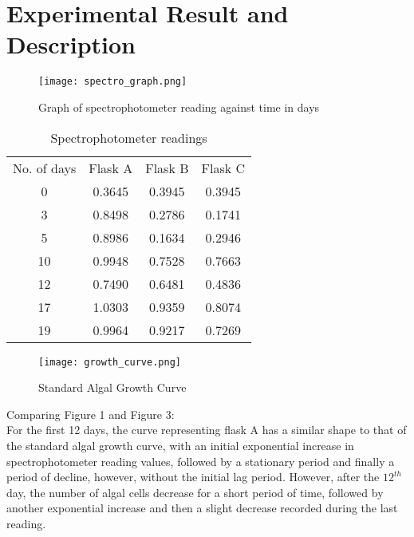 \documentclass[12pt,a4paper]{IEEEtran}
\begin{document}
    \section{Experimental Result and Description}
    \begin{figure}[H]
    	\begin{center}
    		\texttt{[image: spectro\_graph.png]}
    		\caption{Graph of spectrophotometer reading against time in days}
    		\label{fig:spectrograph}
    	\end{center}
    \end{figure}
	\begin{table}[H]
		\centering
		\caption{Spectrophotometer readings}
		\label{tab:spectrotable}
		\small
		\begin{tabular}{|c|c|c|c|}
			No. of days & Flask A & Flask B & Flask C \\
			0           & 0.3645  & 0.3945  & 0.3945  \\
			3           & 0.8498  & 0.2786  & 0.1741  \\
			5           & 0.8986  & 0.1634  & 0.2946  \\
			10          & 0.9948  & 0.7528  & 0.7663  \\
			12          & 0.7490  & 0.6481  & 0.4836  \\
			17          & 1.0303  & 0.9359  & 0.8074  \\
			19          & 0.9964  & 0.9217  & 0.7269          
		\end{tabular}
		\normalsize
	\end{table}
	\begin{figure}[H]
		\begin{center}
			\texttt{[image: growth\_curve.png]}
			\caption{Standard Algal Growth Curve}
			\label{growthcurve}
		\end{center}
	\end{figure}
    Comparing Figure 1 and Figure 3: \\
    
    For the first 12 days, the curve representing flask A has a similar shape to that of the standard algal growth curve, with an initial exponential increase in spectrophotometer reading values, followed by a stationary period and finally a period of decline, however, without the initial lag period. However, after the $12^{th}$ day, the number of algal cells decrease for a short period of time, followed by another exponential increase and then a slight decrease recorded during the last reading. \\
    
\end{document}
